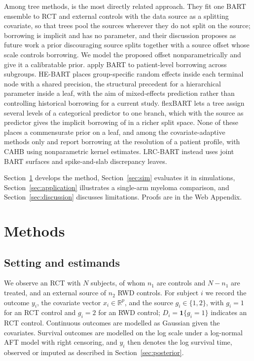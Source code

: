 Among tree methods, \citet{ZhouJi2021} is the most directly related approach. They fit one BART ensemble \citep{Chipman2010BART} to RCT and external controls with the data source as a splitting covariate, so that trees pool the sources wherever they do not split on the source; borrowing is implicit and has no parameter, and their discussion proposes as future work a prior discouraging source splits together with a source offset whose scale controls borrowing. We model the proposed offset nonparametrically and give it a calibratable prior. \citet{Pan2022} apply BART to patient-level borrowing across subgroups. HE-BART \citep{Wundervald2022HEBART} places group-specific random effects inside each terminal node with a shared precision, the structural precedent for a hierarchical parameter inside a leaf, with the aim of mixed-effects prediction rather than controlling historical borrowing for a current study. flexBART \citep{Deshpande2025flexBART} lets a tree assign several levels of a categorical predictor to one branch, which with the source as predictor gives the implicit borrowing of \citet{ZhouJi2021} in a richer split space. None of these places a commensurate prior on a leaf, and among the covariate-adaptive methods only \citet{Jin2023CAHB} and \citet{Alt2024LEAP} report borrowing at the resolution of a patient profile, with CAHB using nonparametric kernel estimates. LRC-BART instead uses joint BART surfaces and spike-and-slab discrepancy leaves.

Section~\ref{sec:methods} develops the method, Section~\ref{sec:sim} evaluates it in simulations, Section~\ref{sec:application} illustrates a single-arm myeloma comparison, and Section~\ref{sec:discussion} discusses limitations. Proofs are in the Web Appendix.

\section{Methods}
\label{sec:methods}

\subsection{Setting and estimands}
\label{sec:setting}

We observe an RCT with $N$ subjects, of whom $n_1$ are controls and $N-n_1$ are treated, and an external source of $n_2$ RWD controls. For subject $i$ we record the outcome $y_i$, the covariate vector $x_i\in\mathbb R^p$, and the source $g_i\in\{1,2\}$, with $g_i=1$ for an RCT control and $g_i=2$ for an RWD control; $D_i=\mathbf 1\{g_i=1\}$ indicates an RCT control. Continuous outcomes are modelled as Gaussian given the covariates. Survival outcomes are modelled on the log scale under a log-normal AFT model with right censoring, and $y_i$ then denotes the log survival time, observed or imputed as described in Section~\ref{sec:posterior}.

